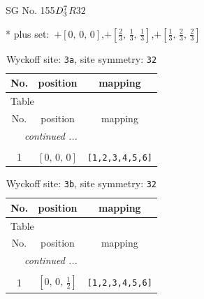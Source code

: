 \documentclass[fleqn,8pt]{jsarticle}
\begin{document}
\setcounter{MaxMatrixCols}{32}

\renewcommand{\tablename}{Table~}
\renewcommand{\figurename}{Figure~}
\begin{center}
\LARGE
SG No. 155\quad$D_{\rm 3}^{7}$\quad$R32$\quad[ trigonal ]
\end{center}
* plus set:\,\,\,$+\left[ 0,\, 0,\, 0 \right]$,\quad $+\left[ \frac{2}{3},\, \frac{1}{3},\, \frac{1}{3} \right]$,\quad $+\left[ \frac{1}{3},\, \frac{2}{3},\, \frac{2}{3} \right]$
\renewcommand{\arraystretch}{1.2}
\begin{longtable}{ccc}
\caption{Wyckoff site: {\tt 3a}, site symmetry: {\tt 32}}
 \\
 \hline \hline
No. & position & mapping \\ \hline \endfirsthead

\multicolumn{2}{l}{\tablename\ \thetable{}} \\
 \hline \hline
No. & position & mapping \\ \hline \endhead

 \hline \hline
\multicolumn{2}{r}{\footnotesize\it continued ...} \\ \endfoot

 \hline \hline
\multicolumn{2}{r}{} \\ \endlastfoot

1 & $\left[ 0,\, 0,\, 0 \right]$ & {\tt [1,2,3,4,5,6]} \\
\end{longtable}
\renewcommand{\arraystretch}{1.2}
\begin{longtable}{ccc}
\caption{Wyckoff site: {\tt 3b}, site symmetry: {\tt 32}}
 \\
 \hline \hline
No. & position & mapping \\ \hline \endfirsthead

\multicolumn{2}{l}{\tablename\ \thetable{}} \\
 \hline \hline
No. & position & mapping \\ \hline \endhead

 \hline \hline
\multicolumn{2}{r}{\footnotesize\it continued ...} \\ \endfoot

 \hline \hline
\multicolumn{2}{r}{} \\ \endlastfoot

1 & $\left[ 0,\, 0,\, \frac{1}{2} \right]$ & {\tt [1,2,3,4,5,6]} \\
\end{longtable}
\renewcommand{\arraystretch}{1.2}
\end{document}
